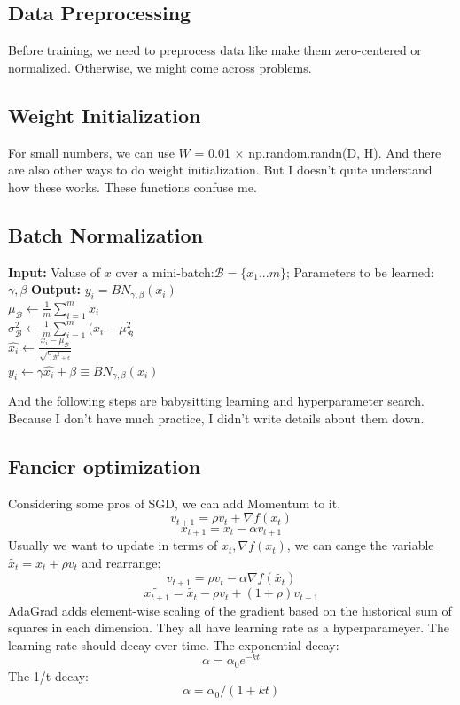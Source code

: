 \documentclass{article}
\begin{document}
\subsection{Data Preprocessing}
Before training, we need to preprocess data like make them zero-centered or normalized. Otherwise, we might come across problems.

\subsection{Weight Initialization}
For small numbers, we can use $W$ = 0.01 $\times $ np.random.randn(D, H). And there are also other ways to do weight initialization. But I doesn't quite understand how these works. These functions confuse me.

\subsection{Batch Normalization}
\textbf{Input: } Valuse of $x$ over a mini-batch:$\mathscr{B} = \{x_1...m\}$; Parameters to be learned: $\gamma, \beta$
\textbf{Output:} ${y_i = BN_{\gamma,\beta}(x_i)}$ \\
$\mu_{\mathscr{B}} \leftarrow \frac{1}{m}\sum\limits_{i=1}^mx_i$ \\
$\sigma_{\mathscr{B}}^2 \leftarrow \frac{1}{m}\sum\limits_{i=1}^m(x_i - \mu_{\mathscr{B}}^2$ \\
$\hat{x_i} \leftarrow \frac{x_i - \mu_{\mathscr{B}}}{\sqrt{\sigma_{\mathscr{B}^2 + \epsilon}}}$ \\
$y_i \leftarrow \gamma \hat{x_i} + \beta \equiv BN_{\gamma,\beta}(x_i)$

And the following steps are babysitting learning and hyperparameter search. Because I don't have much practice, I didn't write details about them down.

\subsection{Fancier optimization}
Considering some pros of SGD, we can add Momentum to it.
\[v_{t+1} = \rho v_t + \nabla f(x_t)\]
\[x_{t+1} = x_t - \alpha v_{t+1}\]
Usually we want to update in terms of $x_t, \nabla f(x_t)$, we can cange the variable $\tilde{x_t} = x_t + \rho v_t$ and rearrange:
\[v_{t+1} = \rho v_t - \alpha \nabla f(\tilde{x_t})\]
\[\tilde{x_{t+1}} = \tilde{x_t} - \rho v_t + (1 + \rho)v_{t+1}\]
AdaGrad adds element-wise scaling of the gradient based on the historical sum of squares in each dimension. They all have learning rate as a hyperparameyer. The learning rate should decay over time. The exponential decay:
\[\alpha = \alpha_0 e^{-kt}\]
The 1/t decay:
\[\alpha = \alpha_0 / (1 + kt)\]
\end{document}
